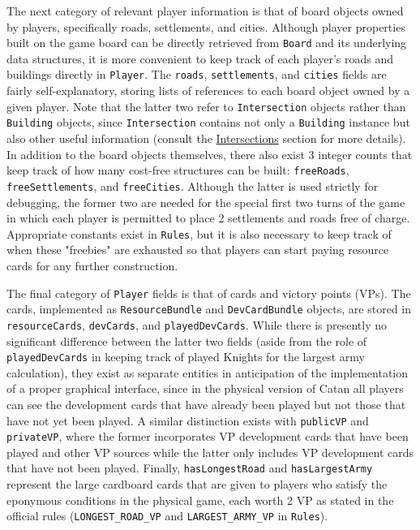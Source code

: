 \documentclass[pageno]{jpaper}
\begin{document}
\begin{doublespacing}
The next category of relevant player information is that of board objects owned by players, specifically roads, settlements, and cities. Although player properties built on the game board can be directly retrieved from \lstinline$Board$ and its underlying data structures, it is more convenient to keep track of each player's roads and buildings directly in \lstinline$Player$. The \lstinline$roads$, \lstinline$settlements$, and \lstinline$cities$ fields are fairly self-explanatory, storing lists of references to each board object owned by a given player. Note that the latter two refer to \lstinline$Intersection$ objects rather than \lstinline$Building$ objects, since \lstinline$Intersection$ contains not only a \lstinline$Building$ instance but also other useful information (consult the \hyperlink{sec:intersections}{Intersections} section for more details). In addition to the board objects themselves, there also exist 3 integer counts that keep track of how many cost-free structures can be built: \lstinline$freeRoads$, \lstinline$freeSettlements$, and \lstinline$freeCities$. Although the latter is used strictly for debugging, the former two are needed for the special first two turns of the game in which each player is permitted to place 2 settlements and roads free of charge. Appropriate constants exist in \lstinline$Rules$, but it is also necessary to keep track of when these "freebies" are exhausted so that players can start paying resource cards for any further construction.
    
The final category of \lstinline$Player$ fields is that of cards and victory points (VPs). The cards, implemented as \lstinline$ResourceBundle$ and \lstinline$DevCardBundle$ objects, are stored in \lstinline$resourceCards$, \lstinline$devCards$, and \lstinline$playedDevCards$. While there is presently no significant difference between the latter two fields (aside from the role of \lstinline$playedDevCards$ in keeping track of played Knights for the largest army calculation), they exist as separate entities in anticipation of the implementation of a proper graphical interface, since in the physical version of Catan all players can see the development cards that have already been played but not those that have not yet been played. A similar distinction exists with \lstinline$publicVP$ and \lstinline$privateVP$, where the former incorporates VP development cards that have been played and other VP sources while the latter only includes VP development cards that have not been played. Finally, \lstinline$hasLongestRoad$ and \lstinline$hasLargestArmy$ represent the large cardboard cards that are given to players who satisfy the eponymous conditions in the physical game, each worth 2 VP as stated in the official rules (\lstinline$LONGEST_ROAD_VP$ and \lstinline$LARGEST_ARMY_VP$ in \lstinline$Rules$).


\end{doublespacing}
\end{document}
